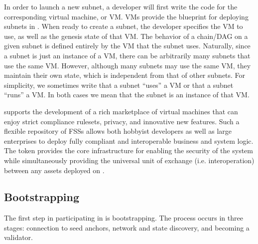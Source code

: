 \documentclass[runningheads]{llncs}
\begin{document}
In order to launch a new subnet, a developer will first write the code for the corresponding virtual machine, or VM. 
VMs provide the blueprint for deploying subnets in \AVAPlatformName{}. 
When ready to create a subnet, the developer specifies the VM to use, as well as the genesis state of that VM. The behavior of a chain/DAG on a given subnet is defined entirely by the VM that the subnet uses. Naturally, since a subnet is just an instance of a VM, there can be arbitrarily many subnets that use the same VM. However, although many subnets may use the same VM, they maintain their own state, which is independent from that of other subnets. For simplicity, we sometimes write that a subnet ``uses'' a VM or that a subnet ``runs'' a VM. In both cases we mean that the subnet is an instance of that VM.

\AVAPlatformName{} supports the development of a rich marketplace of virtual machines that can enjoy strict compliance rulesets, privacy, and innovative new features. Such a flexible repository of FSSs allows both hobbyist developers as well as large enterprises to deploy fully compliant and interoperable business and system logic. The \AVATokenName{} token provides the core infrastructure for enabling the security of the system while simultaneously providing the universal unit of exchange (i.e. interoperation) between any assets deployed on \AVAPlatformName{}. 



\subsection{Bootstrapping}
The first step in participating in \AVAPlatformName{} is bootstrapping. The process occurs in three stages: connection to seed anchors, network and state discovery, and becoming a validator. 
\end{document}
